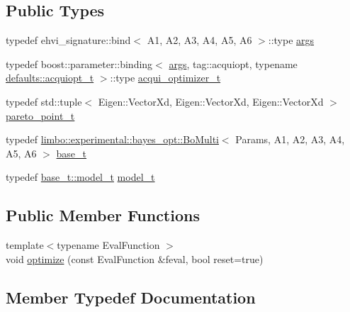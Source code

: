 \subsection*{Public Types}
\begin{DoxyCompactItemize}
\item 
typedef ehvi\+\_\+signature\+::bind$<$ A1, A2, A3, A4, A5, A6 $>$\+::type \hyperlink{classlimbo_1_1experimental_1_1bayes__opt_1_1_ehvi_ad5deb9cf89fe77464130cd2d400b5d7b}{args}
\item 
typedef boost\+::parameter\+::binding$<$ \hyperlink{classlimbo_1_1bayes__opt_1_1_bo_base_a3844c259aa1e59d0241f90390aa6f7fa}{args}, tag\+::acquiopt, typename \hyperlink{structlimbo_1_1experimental_1_1bayes__opt_1_1_ehvi_1_1defaults_a3d7a04bbbd73b4f95710c29fd88551bf}{defaults\+::acquiopt\+\_\+t} $>$\+::type \hyperlink{classlimbo_1_1experimental_1_1bayes__opt_1_1_ehvi_a73568ce8f21582499102ca29a8ccbc68}{acqui\+\_\+optimizer\+\_\+t}
\item 
typedef std\+::tuple$<$ Eigen\+::\+Vector\+Xd, Eigen\+::\+Vector\+Xd, Eigen\+::\+Vector\+Xd $>$ \hyperlink{classlimbo_1_1experimental_1_1bayes__opt_1_1_ehvi_a8e741bf553820c0f0af7b9545d2d773c}{pareto\+\_\+point\+\_\+t}
\item 
typedef \hyperlink{classlimbo_1_1experimental_1_1bayes__opt_1_1_bo_multi}{limbo\+::experimental\+::bayes\+\_\+opt\+::\+Bo\+Multi}$<$ Params, A1, A2, A3, A4, A5, A6 $>$ \hyperlink{classlimbo_1_1experimental_1_1bayes__opt_1_1_ehvi_ad0955fc65023479e48d85c50f1b2804d}{base\+\_\+t}
\item 
typedef \hyperlink{classlimbo_1_1bayes__opt_1_1_bo_base_a151af5c7eef92a82d8813bb2e067d267}{base\+\_\+t\+::model\+\_\+t} \hyperlink{classlimbo_1_1experimental_1_1bayes__opt_1_1_ehvi_af064e606073005f78ef0445d4ab4bc31}{model\+\_\+t}
\end{DoxyCompactItemize}
\subsection*{Public Member Functions}
\begin{DoxyCompactItemize}
\item 
{\footnotesize template$<$typename Eval\+Function $>$ }\\void \hyperlink{classlimbo_1_1experimental_1_1bayes__opt_1_1_ehvi_a44003c1ef6450cbcce18e5c978e30f2c}{optimize} (const Eval\+Function \&feval, bool reset=true)
\end{DoxyCompactItemize}


\subsection{Member Typedef Documentation}
\hypertarget{classlimbo_1_1experimental_1_1bayes__opt_1_1_ehvi_a73568ce8f21582499102ca29a8ccbc68}{}

